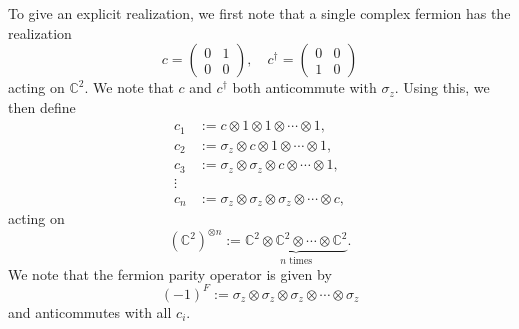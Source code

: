 \documentclass[12pt]{article}
\numberwithin{equation}{section}
\numberwithin{figure}{section}
\theoremstyle{remark}
\def\bC{\mathbb{C}}
\begin{document}
To give an explicit realization, we first note that a single complex fermion has the realization
\begin{equation}
c=\begin{pmatrix}
0 & 1 \\
0 & 0 
\end{pmatrix},\quad
c^\dagger=\begin{pmatrix}
0 & 0\\
1 & 0
\end{pmatrix}
\end{equation} acting on $\bC^2$.
We note that $c$ and $c^\dagger$ both anticommute with $\sigma_z$.
Using this, we then define \begin{equation}
\begin{aligned}
c_1 &:= c \otimes 1 \otimes 1\otimes \cdots \otimes 1 ,\\
c_2 &:= \sigma_z \otimes c \otimes 1\otimes \cdots \otimes 1 ,\\
c_3 &:= \sigma_z \otimes \sigma_z \otimes c \otimes \cdots \otimes 1 ,\\
\vdots \\
c_n &:= \sigma_z \otimes\sigma_z \otimes \sigma_z \otimes\cdots\otimes c,
\end{aligned} 
\label{complex-fermions}
\end{equation} acting on \begin{equation}
(\bC^2)^{\otimes n} := \underbrace{\bC^2\otimes \bC^2\otimes \cdots \otimes \bC^2}_\text{$n$ times}.
\end{equation}
We note that the fermion parity operator is given by \begin{equation}
(-1)^F := \sigma_z \otimes\sigma_z \otimes \sigma_z \otimes\cdots\otimes \sigma_z
\end{equation}
and anticommutes with all $c_i$.
\end{document}
